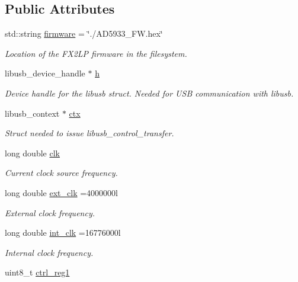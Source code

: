 \subsection*{Public Attributes}
\begin{DoxyCompactItemize}
\item 
std\+::string \mbox{\hyperlink{struct_a_d5933_ac9313bfb503cad74b1b6d60d2c3a406d}{firmware}} = \char`\"{}./A\+D5933\+\_\+F\+W.\+hex\char`\"{}
\begin{DoxyCompactList}\small\item\em Location of the F\+X2\+LP firmware in the filesystem. \end{DoxyCompactList}\item 
libusb\+\_\+device\+\_\+handle $\ast$ \mbox{\hyperlink{struct_a_d5933_a9703faf65218591bf85b8338289e5162}{h}}
\begin{DoxyCompactList}\small\item\em Device handle for the libusb struct. Needed for U\+SB communication with libusb. \end{DoxyCompactList}\item 
libusb\+\_\+context $\ast$ \mbox{\hyperlink{struct_a_d5933_a4399d7961b63bcaccb5f15974d1aa551}{ctx}}
\begin{DoxyCompactList}\small\item\em Struct needed to issue libusb\+\_\+control\+\_\+transfer. \end{DoxyCompactList}\item 
long double \mbox{\hyperlink{struct_a_d5933_a552da2a3ded06d4b125857bfd98c4af3}{clk}}
\begin{DoxyCompactList}\small\item\em Current clock source frequency. \end{DoxyCompactList}\item 
long double \mbox{\hyperlink{struct_a_d5933_a7b6a28a12eb6a913a04e895499c68176}{ext\+\_\+clk}} =4000000l
\begin{DoxyCompactList}\small\item\em External clock frequency. \end{DoxyCompactList}\item 
long double \mbox{\hyperlink{struct_a_d5933_ad02bf6e28b287b4d1cc29804abf5d61b}{int\+\_\+clk}} =16776000l
\begin{DoxyCompactList}\small\item\em Internal clock frequency. \end{DoxyCompactList}\item 
uint8\+\_\+t \mbox{\hyperlink{struct_a_d5933_ad9e85de1ff2845c130ced2d96767ec8d}{ctrl\+\_\+reg1}}

\end{DoxyCompactItemize}
